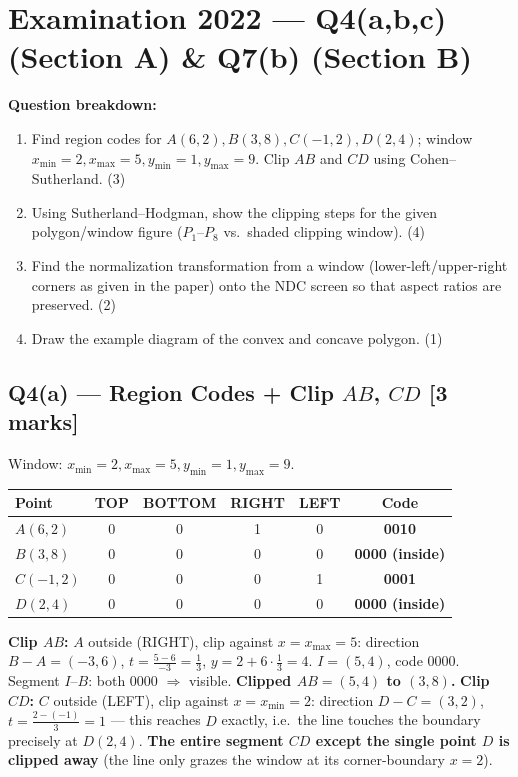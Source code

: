 \documentclass[12pt, a4paper]{article}
\newenvironment{solutionbox}{\begin{mdframed}[style=solutionframe]}{\end{mdframed}}
\begin{document}
\section{Examination 2022 --- Q4(a,b,c) (Section A) \& Q7(b) (Section B)}
\begin{solutionbox}
\textbf{Question breakdown:}
\begin{enumerate}[noitemsep]
  \item[Q4(a)] Find region codes for $A(6,2), B(3,8), C(-1,2), D(2,4)$; window $x_{\min}=2,x_{\max}=5,y_{\min}=1,y_{\max}=9$. Clip $AB$ and $CD$ using Cohen--Sutherland. (3)
  \item[Q4(b)] Using Sutherland--Hodgman, show the clipping steps for the given polygon/window figure ($P_1$--$P_8$ vs.\ shaded clipping window). (4)
  \item[Q4(c)] Find the normalization transformation from a window (lower-left/upper-right corners as given in the paper) onto the NDC screen so that aspect ratios are preserved. (2)
  \item[Q7(b)] Draw the example diagram of the convex and concave polygon. (1)
\end{enumerate}
\end{solutionbox}

\subsection*{Q4(a) --- Region Codes + Clip $AB$, $CD$ [3 marks]}
\begin{solutionbox}
Window: $x_{\min}=2,x_{\max}=5,y_{\min}=1,y_{\max}=9$.
\begin{center}
\begin{tabular}{lccccc}
\toprule
Point & TOP & BOTTOM & RIGHT & LEFT & Code \\
\midrule
$A(6,2)$ & 0 & 0 & 1 & 0 & \textbf{0010} \\
$B(3,8)$ & 0 & 0 & 0 & 0 & \textbf{0000 (inside)} \\
$C(-1,2)$ & 0 & 0 & 0 & 1 & \textbf{0001} \\
$D(2,4)$ & 0 & 0 & 0 & 0 & \textbf{0000 (inside)} \\
\bottomrule
\end{tabular}
\end{center}
\textbf{Clip $AB$:} $A$ outside (RIGHT), clip against $x=x_{\max}=5$: direction $B-A=(-3,6)$, $t=\frac{5-6}{-3}=\frac13$, $y=2+6\cdot\frac13=4$. $I=(5,4)$, code $0000$. Segment $I$--$B$: both $0000$ $\Rightarrow$ visible. \textbf{Clipped $AB=(5,4)$ to $(3,8)$.}
\textbf{Clip $CD$:} $C$ outside (LEFT), clip against $x=x_{\min}=2$: direction $D-C=(3,2)$, $t=\frac{2-(-1)}{3}=1$ --- this reaches $D$ exactly, i.e.\ the line touches the boundary precisely at $D(2,4)$. \textbf{The entire segment $CD$ except the single point $D$ is clipped away} (the line only grazes the window at its corner-boundary $x=2$).
\end{solutionbox}
\end{document}
